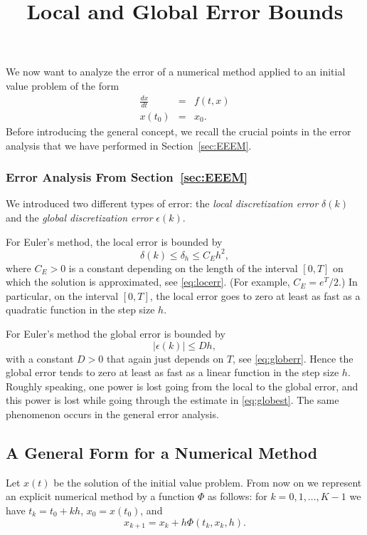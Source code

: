 \documentclass{ximera}
\title{Local and Global Error Bounds}
\begin{document}
\begin{abstract}
\end{abstract}
\maketitle


\label{sec:LGEE}

We now want to analyze the error of a numerical method applied
to an initial value problem of the form
\begin{eqnarray*}
\frac{dx}{dt} & = & f(t,x)\\
 x(t_0) & = & x_0.
\end{eqnarray*}
Before introducing the general concept, we recall the crucial points 
in the error analysis that we have performed in Section~\ref{sec:EEEM}.  

\subsubsection*{Error Analysis From Section~\ref{sec:EEEM}}

We introduced two different types
of error: the {\em local discretization error\/} $\delta(k)$ and the 
{\em global discretization error\/} $\epsilon(k)$.  

For Euler's method, the local error is bounded by
\[
\delta(k)\le \delta_h \le C_E h^2,
\]
where $C_E >0$ is a constant depending on the length of the interval 
$[0,T]$ on which the solution is approximated, see \eqref{eq:locerr}.  
(For example, $C_E =e^T/2$.)  In particular, on the interval
$[0,T]$, the local error goes to zero at least as fast as a 
quadratic function in the step size $h$.

For Euler's method the global error is bounded by
\[
|\epsilon(k)|\le Dh,
\]
with a constant $D>0$ that again just depends on $T$, see 
\eqref{eq:globerr}.  Hence the global error tends to zero at least as fast 
as a linear function in the step size $h$.  Roughly speaking, one power 
is lost going from the local to the global error, and this power is
lost while going through the estimate in \eqref{eq:globest}.  The same
phenomenon occurs in the general error analysis.

\subsection*{A General Form for a Numerical Method}

Let $x(t)$ be the solution of the initial value problem.
From now on we represent an explicit numerical 
method by a function $\Phi$
as follows: for $k=0,1,\ldots,K-1$ we have $t_k=t_0 + kh$, $x_0 = x(t_0)$,
and
\[
x_{k+1} = x_k + h\Phi(t_k,x_k,h).
\]
\end{document}
